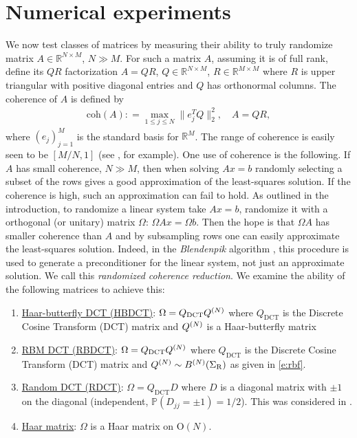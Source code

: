\documentclass{amsart}
\theoremstyle{definition}
\theoremstyle{remark}
\numberwithin{equation}{section}
\begin{document}

\section{Numerical experiments}\label{s:numerics}

We now test classes of matrices by measuring their ability to truly randomize matrix $A \in \mathbb R^{N \times M}$, $N \gg M$.  For such a matrix $A$, assuming it is of full rank, define its $QR$ factorization $A = QR$, $Q \in \mathbb R^{N \times M}$, $R \in \mathbb R^{M\times M}$ where $R$ is upper triangular with positive diagonal entries and $Q$ has orthonormal columns.  The coherence of $A$ is defined by
\begin{align}
  \mathrm{coh}(A) : = \max_{1 \leq j \leq N} \| e_j^T Q\|_2^2, \quad A = QR,
\end{align}
where $(e_j)_{j=1}^M$ is the standard basis for $\mathbb R^M$.  The range of coherence is easily seen to be $[M/N,1]$ (see \cite{Ipsen2014}, for example).  One use of coherence is the following.  If $A$ has small coherence, $N \gg M$, then when solving $Ax = b$ randomly selecting a subset of the rows gives a good approximation of the least-squares solution.  If the coherence is high, such an approximation can fail to hold. As outlined in the introduction, to randomize a linear system take $Ax = b$, randomize it with a orthogonal (or unitary) matrix $\Omega$: $\Omega A x = \Omega b$.  Then the hope is that $\Omega A$ has smaller coherence than $A$ and by subsampling rows one can easily approximate the least-squares solution.  Indeed, in the \emph{Blendenpik} algorithm \cite{Avron2010}, this procedure is used to generate a preconditioner for the linear system, not just an approximate solution.  We call this \emph{randomized coherence reduction}.  We examine the ability of the following matrices to achieve this:
\begin{enumerate}
\item \underline{Haar-butterfly DCT (HBDCT)}: $\Omega = Q_{\mathrm{DCT}} Q^{(N)}$ where $Q_{\mathrm{DCT}}$ is the Discrete Cosine Transform (DCT) matrix and $Q^{(N)}$ is a Haar-butterfly matrix
\item \underline{RBM DCT (RBDCT)}: $\Omega = Q_{\mathrm{DCT}} Q^{(N)}$ where $Q_{\mathrm{DCT}}$ is the Discrete Cosine Transform (DCT) matrix and $Q^{(N)} \sim B^{(N)}(\Sigma_{\mathrm R})$ as given in \eqref{e:rbf}.
\item \underline{Random DCT (RDCT)}:  $\Omega = Q_{\mathrm{DCT}} D$ where $D$ is a diagonal matrix with $\pm 1$ on the diagonal (independent, $\mathbb P( D_{jj} = \pm 1) = 1/2$).  This was considered in \cite{Avron2010}.
\item \underline{Haar matrix}: $\Omega$ is a Haar matrix on $\mathrm O(N)$.
\end{enumerate}
\end{document}
